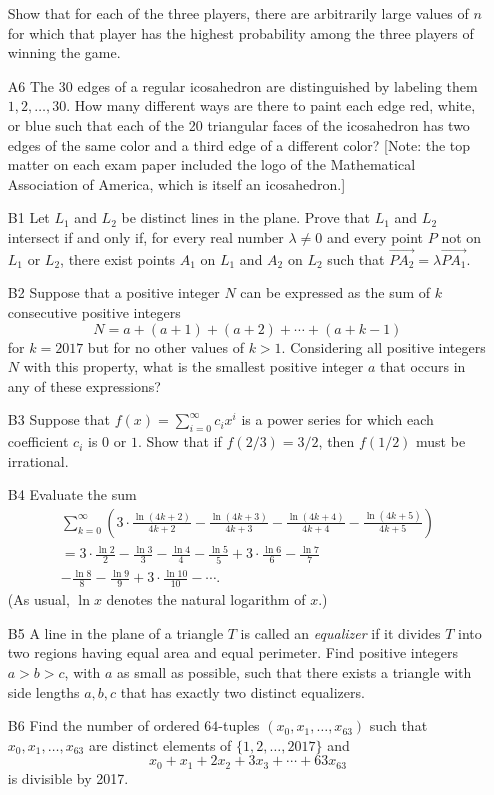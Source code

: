 \documentclass[amssymb,twocolumn,pra,10pt,aps]{revtex4-1}
\begin{document}
\begin{itemize}
Show that for each of the three players, there are arbitrarily large values of $n$ for which that player has the highest probability among the three players of winning the game. 

\item[A6]
The 30 edges of a regular icosahedron are distinguished by labeling them $1,2,\dots,30$. How many different ways 
are there to paint each edge red, white, or blue such that each of the 20 triangular faces of the icosahedron has two edges of the same color and a third edge of a different color? [Note: the top matter on each exam paper included the logo of the Mathematical Association of America, which is itself an icosahedron.]

\item[B1]
Let $L_1$ and $L_2$ be distinct lines in the plane. Prove that $L_1$ and $L_2$ intersect if and only if, for every
real number $\lambda\neq 0$ and every point $P$ not on $L_1$ or $L_2$, there exist points $A_1$ on $L_1$ and $A_2$
on $L_2$ such that $\overrightarrow{PA_2} = \lambda \overrightarrow{PA_1}$.

\item[B2]
Suppose that a positive integer $N$ can be expressed as the sum of $k$ consecutive positive integers
\[
N = a + (a+1) +(a+2) + \cdots + (a+k-1)
\]
for $k=2017$ but for no other values of $k>1$. Considering all positive integers $N$ with this property,
what is the smallest positive integer $a$ that occurs in any of these expressions?

\item[B3]
Suppose that $f(x) = \sum_{i=0}^\infty c_i x^i$ is a power series for which each coefficient $c_i$ is $0$ or $1$.
Show that if $f(2/3) = 3/2$, then $f(1/2)$ must be irrational.

\item[B4]
Evaluate the sum
\begin{gather*}
\sum_{k=0}^\infty \left( 3 \cdot \frac{\ln(4k+2)}{4k+2} - \frac{\ln(4k+3)}{4k+3} - \frac{\ln(4k+4)}{4k+4} - \frac{\ln(4k+5)}{4k+5} \right) \\
= 3 \cdot \frac{\ln 2}{2} - \frac{\ln 3}{3} - \frac{\ln 4}{4} - \frac{\ln 5}{5}
+ 3 \cdot \frac{\ln 6}{6} - \frac{\ln 7}{7} \\ - \frac{\ln 8}{8} - \frac{\ln 9}{9}
+ 3 \cdot \frac{\ln 10}{10} - \cdots .
\end{gather*}
(As usual, $\ln x$ denotes the natural logarithm of $x$.)

\item[B5]
A line in the plane of a triangle $T$ is called an \emph{equalizer} if it divides $T$ into two regions having equal area and equal perimeter. Find positive integers $a>b>c$, with $a$ as small as possible, such that there exists a triangle with side lengths $a, b, c$ that has exactly two distinct equalizers.

\item[B6]
Find the number of ordered $64$-tuples $(x_0,x_1,\dots,x_{63})$ such that $x_0,x_1,\dots,x_{63}$ are distinct elements of $\{1,2,\dots,2017\}$ and 
\[
x_0 + x_1 + 2x_2 + 3x_3 + \cdots + 63 x_{63}
\]
is divisible by 2017.
\end{itemize}
\end{document}
